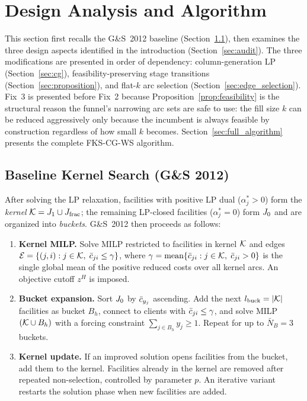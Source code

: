 \section{Design Analysis and Algorithm}
\label{sec:algorithm}

This section first recalls the G\&S~2012 baseline
(Section~\ref{sec:ks_baseline}), then examines the three design aspects
identified in the introduction (Section~\ref{sec:audit}).
The three modifications are presented in order of dependency:
column-generation LP (Section~\ref{sec:cg}),
feasibility-preserving stage transitions (Section~\ref{sec:proposition}),
and flat-$k$ arc selection (Section~\ref{sec:edge_selection}).
Fix~3 is presented before Fix~2 because Proposition~\ref{prop:feasibility}
is the structural reason the funnel's narrowing arc sets are safe to use:
the fill size $k$ can be reduced aggressively only because the incumbent
is always feasible by construction regardless of how small $k$ becomes.
Section~\ref{sec:full_algorithm} presents the complete FKS-CG-WS algorithm.

\subsection{Baseline Kernel Search (G\&S 2012)}
\label{sec:ks_baseline}

After solving the LP relaxation, facilities with positive LP dual
($\alpha^*_j > 0$) form the \emph{kernel} $\mathcal{K} = J_1 \cup J_{\text{frac}}$;
the remaining LP-closed facilities ($\alpha^*_j = 0$) form $J_0$ and are
organized into \emph{buckets}.
G\&S~2012 then proceeds as follows:

\begin{enumerate}
  \item \textbf{Kernel MILP.}
    Solve MILP restricted to facilities in kernel $\mathcal{K}$ and edges
    $\mathcal{E} = \{(j,i) : j \in \mathcal{K},\; \bar{c}_{ji} \leq \gamma\}$,
    where $\gamma = \text{mean}\{\bar{c}_{ji} : j \in \mathcal{K},\; \bar{c}_{ji} > 0\}$ is the
    single global mean of the positive reduced costs over all kernel arcs.
    An objective cutoff $z^H$ is imposed.
  \item \textbf{Bucket expansion.}
    Sort $J_0$ by $\bar{c}_{y_j}$ ascending.
    Add the next $l_{\text{buck}} = |\mathcal{K}|$ facilities as bucket $B_h$,
    connect to clients with $\bar{c}_{ji} \leq \gamma$, and solve
    MILP$(\mathcal{K} \cup B_h)$ with a forcing constraint $\sum_{j \in B_h} y_j \geq 1$.
    Repeat for up to $\bar{N}_B = 3$ buckets.
  \item \textbf{Kernel update.}
    If an improved solution opens facilities from the bucket, add them to the
    kernel.
    Facilities already in the kernel are removed after repeated non-selection,
    controlled by parameter $p$.
    An iterative variant restarts the solution phase when new facilities are
    added.
\end{enumerate}


